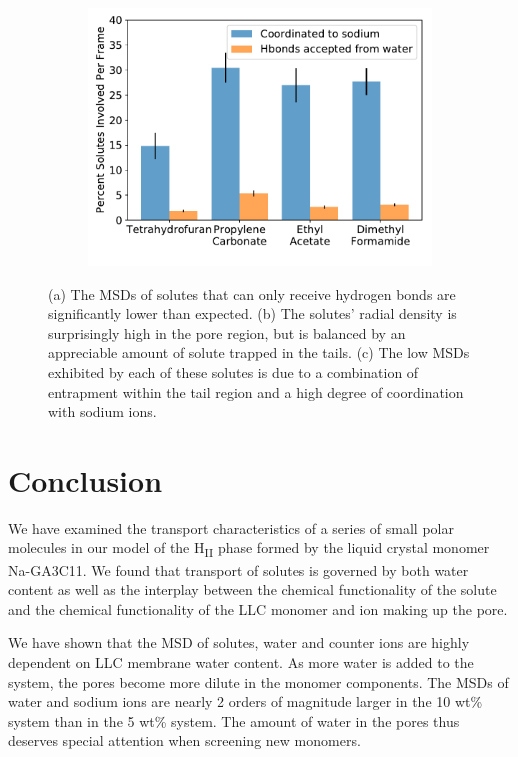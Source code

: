 \documentclass[journal=jpcbfk,manuscript=article]{achemso}
\begin{document}
\begin{figure}[!htb]
\begin{subfigure}{0.325\textwidth}
  \caption{}\label{fig:nondonors_rdf}
  \end{subfigure}
  \begin{subfigure}{0.325\textwidth}
  \includegraphics[width=\textwidth]{nondonor_hbonds.pdf}
  \caption{}\label{fig:nondonors_hbonds}
  \end{subfigure}
  \caption{(a) The MSDs of solutes that can only receive hydrogen bonds are
  significantly lower than expected. (b) The solutes' radial density
  is surprisingly high in the pore region, but is balanced by an appreciable
  amount of solute trapped in the tails. (c) The low MSDs exhibited by each of these
  solutes is due to a combination of entrapment within the tail region and a high 
  degree of coordination with sodium ions.}\label{fig:nondonors}
  \end{figure}

  \section{Conclusion}

  We have examined the transport characteristics of a series of small polar
  molecules in our model of the H\textsubscript{II} phase formed by the liquid 
  crystal monomer Na-GA3C11. We found that transport of solutes is 
  governed by both water content as well as the interplay between the chemical functionality of the solute
  and the chemical functionality of the LLC monomer and ion making up the pore. 

  We have shown that the MSD of solutes, water and counter ions are highly
  dependent on LLC membrane water content. As more water is added to the system,
  the pores become more dilute in the monomer components. The MSDs of water and
  sodium ions are nearly 2 orders of magnitude larger in the 10 wt\% system than
  in the 5 wt\% system. The amount of water in the pores thus deserves special
  attention when screening new monomers.
  
\end{document}
